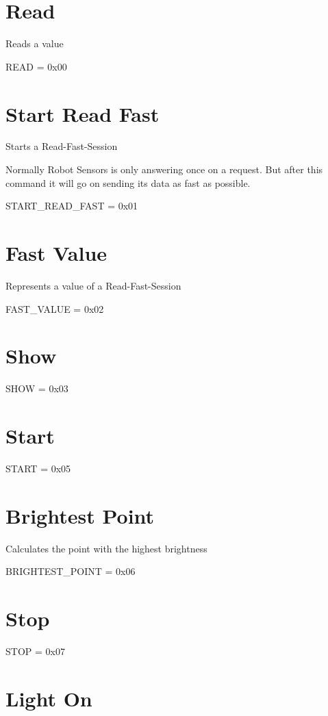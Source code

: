 \label{cmd_doc_cmdDocAnchor}%
\hypertarget{cmd_doc_cmdDocAnchor}{}%
 \hypertarget{cmd_doc_Read}{}\section{Read}\label{cmd_doc_Read}
Reads a value\par
 R\-E\-A\-D = 0x00\hypertarget{cmd_doc_StartReadFast}{}\section{Start Read Fast}\label{cmd_doc_StartReadFast}
Starts a Read-\/\-Fast-\/\-Session\par
 Normally Robot Sensors is only answering once on a request. But after this command it will go on sending its data as fast as possible.\par
 S\-T\-A\-R\-T\-\_\-\-R\-E\-A\-D\-\_\-\-F\-A\-S\-T = 0x01\hypertarget{cmd_doc_FastValue}{}\section{Fast Value}\label{cmd_doc_FastValue}
Represents a value of a Read-\/\-Fast-\/\-Session \par
 F\-A\-S\-T\-\_\-\-V\-A\-L\-U\-E = 0x02\hypertarget{cmd_doc_Show}{}\section{Show}\label{cmd_doc_Show}
S\-H\-O\-W = 0x03\hypertarget{cmd_doc_Start}{}\section{Start}\label{cmd_doc_Start}
S\-T\-A\-R\-T = 0x05\hypertarget{cmd_doc_BrightestPoint}{}\section{Brightest Point}\label{cmd_doc_BrightestPoint}
Calculates the point with the highest brightness\par
 B\-R\-I\-G\-H\-T\-E\-S\-T\-\_\-\-P\-O\-I\-N\-T = 0x06\hypertarget{cmd_doc_Stop}{}\section{Stop}\label{cmd_doc_Stop}
S\-T\-O\-P = 0x07\hypertarget{cmd_doc_LightOn}{}\section{Light On}\label{cmd_doc_LightOn}
